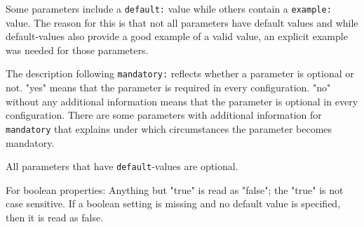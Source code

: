 Some parameters include a \texttt{default:} value while others contain a \texttt{example:} value. The reason for this is that not all parameters have default values and while default-values also provide a good example of a valid value, an explicit example was needed for those parameters.

The description following \texttt{mandatory:}  reflects whether a parameter is optional or not. "yes" means that the parameter is required in every configuration. "no" without any additional information means that the parameter is optional in every configuration. There are some parameters with additional information for \texttt{mandatory} that explains under which circumstances the parameter becomes mandatory.

All parameters that have \texttt{default}-values are optional.

For boolean properties: Anything but "true" is read as "false"; the "true" is not case sensitive. If a boolean setting is missing and no default value is specified, then it is read as false.

